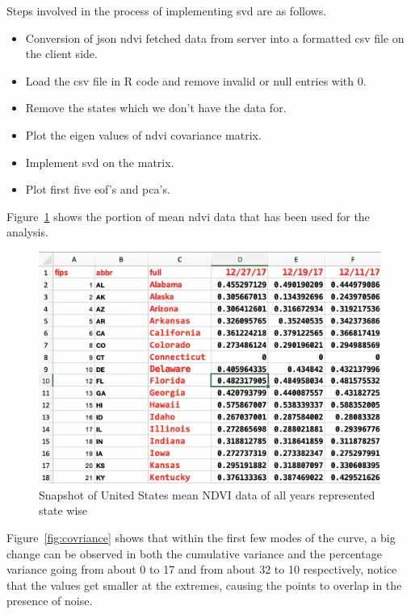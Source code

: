 Steps involved in the process of implementing \gls{svd} are as follows.

\begin{itemize}
    \item Conversion of \gls{json} \gls{ndvi} fetched data from server into a formatted \gls{csv} file on the client side.
    \item Load the csv file in R code and remove invalid or null entries with 0.
    \item Remove the states which we don't have the data for.
    \item Plot the eigen values of \gls{ndvi} covariance matrix.
    \item Implement \gls{svd} on the matrix.
    \item Plot first five \gls{eof}'s and \gls{pca}'s.
\end{itemize}

Figure~\ref{fig:svd_data_snapshot} shows the portion of mean \gls{ndvi} data that has been used for the analysis.

  \begin{figure}[H]
            \centering
            \includegraphics[width=1.0\linewidth]{figures/ch5/svd_data_snapshot.png}
            \caption{\label{fig:svd_data_snapshot} Snapshot of United States mean NDVI data of all years represented state wise}
    \end{figure}
    
Figure~\ref{fig:covriance} shows that within the first few modes of the curve, a big change can be observed in both the cumulative variance and the percentage variance going from about 0 to 17 and from about 32 to 10 respectively, notice that the values get smaller at the extremes, causing the points to overlap in the presence of noise.

